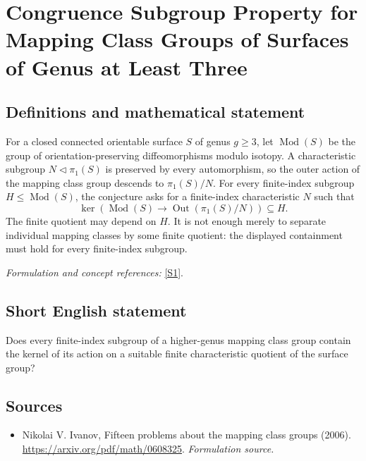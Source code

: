 \documentclass[11pt]{article}
\begin{document}
\section*{\texorpdfstring{Congruence Subgroup Property for Mapping Class Groups of Surfaces of Genus at Least Three}{Congruence Subgroup Property for Mapping Class Groups of Surfaces of Genus at Least Three}}\label{343}
\subsection{Definitions and mathematical statement}
For a closed connected orientable surface $S$ of genus $g\ge3$, let $\operatorname{Mod}(S)$ be the group of orientation-preserving diffeomorphisms modulo isotopy. A characteristic subgroup $N\triangleleft\pi_1(S)$ is preserved by every automorphism, so the outer action of the mapping class group descends to $\pi_1(S)/N$. For every finite-index subgroup $H\le\operatorname{Mod}(S)$, the conjecture asks for a finite-index characteristic $N$ such that
\[
 \ker\!\left(\operatorname{Mod}(S)\longrightarrow
 \operatorname{Out}(\pi_1(S)/N)\right)\subseteq H.
\]
The finite quotient may depend on $H$. It is not enough merely to separate individual mapping classes by some finite quotient: the displayed containment must hold for every finite-index subgroup.
\par\smallskip\textit{Formulation and concept references:} \href{https://arxiv.org/pdf/math/0608325}{[S1]}.

\subsection{Short English statement}
Does every finite-index subgroup of a higher-genus mapping class group contain the kernel of its action on a suitable finite characteristic quotient of the surface group?
\subsection{Sources}
\begin{itemize}
\item[S1]Nikolai V. Ivanov, Fifteen problems about the mapping class groups (2006).
\url{https://arxiv.org/pdf/math/0608325}.
\textit{Formulation source.}
\end{itemize}
\end{document}

